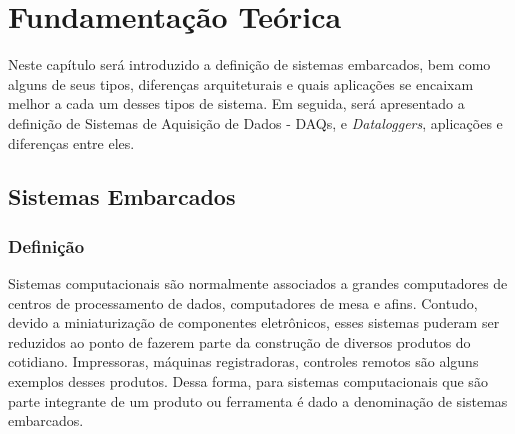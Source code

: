 \chapter{Fundamentação Teórica}
\label{cap:fundamentacao-teorica}



Neste capítulo será introduzido a definição de sistemas embarcados, bem como alguns de seus tipos, diferenças arquiteturais e quais aplicações se encaixam melhor a cada um desses tipos de sistema. Em seguida, será apresentado a definição de Sistemas de Aquisição de Dados - DAQs, e \textit{Dataloggers}, aplicações e diferenças entre eles.





\section{Sistemas Embarcados}\label{sec:definicao_sistemas_embarcados}

\subsection{Definição}

Sistemas computacionais são normalmente associados a grandes computadores de centros de processamento de dados, computadores de mesa e afins. Contudo, devido a miniaturização de componentes eletrônicos, esses sistemas puderam ser reduzidos ao ponto de fazerem parte da construção de diversos produtos do cotidiano. Impressoras, máquinas registradoras, controles remotos são alguns exemplos desses produtos. Dessa forma, para sistemas computacionais que são parte integrante de um produto ou ferramenta é dado a denominação de sistemas embarcados.


